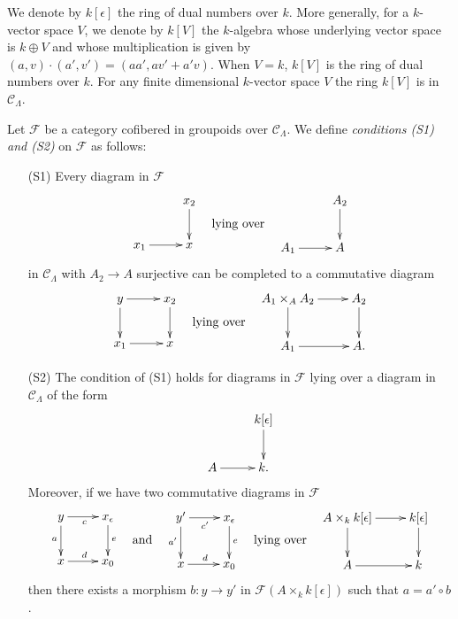 \medskip\noindent
We denote by $k[\epsilon]$ the ring of dual numbers over $k$.  More 
generally, for a $k$-vector space $V$, we denote by $k[V]$ the $k$-algebra 
whose underlying vector space is $k \oplus V$ and whose multiplication is given 
by $(a,v) \cdot (a',v') = (aa', av' + a'v)$.  When $V = k$, $k[V]$ is the ring 
of dual numbers over $k$.  For any finite dimensional $k$-vector space $V$
the ring $k[V]$ is in $\mathcal{C}_\Lambda$.

\begin{definition}
\label{definition-S1-S2}
Let $\mathcal{F}$ be a category cofibered in groupoids over $\mathcal 
C_\Lambda$. We define {\it conditions (S1) and (S2)}
on $\mathcal{F}$ as follows:
\begin{enumerate}
\item[(S1)] Every diagram in $\mathcal{F}$
$$
\vcenter{
\xymatrix{
           & x_2 \ar[d] \\
x_1 \ar[r] & x   
}
}
\quad\text{lying over}\quad
\vcenter{
\xymatrix{
           & A_2 \ar[d] \\
A_1 \ar[r] & A   
}
}
$$  
in $\mathcal{C}_\Lambda$ with $A_2 \to A$ surjective can be completed 
to a commutative diagram
$$
\vcenter{
\xymatrix{
y \ar[r] \ar[d] & x_2 \ar[d] \\
x_1 \ar[r]      & x   
}
}
\quad\text{lying over}\quad
\vcenter{
\xymatrix{
A_1 \times_{A} A_2 \ar[r] \ar[d] & A_2 \ar[d] \\ 
A_1 \ar[r]      & A.   
}
}
$$
\item[(S2)]
The condition of (S1) holds for diagrams in $\mathcal{F}$ lying over 
a diagram in $\mathcal{C}_\Lambda$ of the form
$$
\xymatrix{
          & k[\epsilon] \ar[d] \\
A  \ar[r] & k.
}
$$  
Moreover, if we have two commutative diagrams in $\mathcal{F}$
$$
\vcenter{
\xymatrix{
y \ar[r]_c \ar[d]_a & x_\epsilon \ar[d]^e \\
x \ar[r]^d          & x_0
}
}
\quad\text{and}\quad
\vcenter{
\xymatrix{
y' \ar[r]_{c'} \ar[d]_{a'} & x_\epsilon \ar[d]^e \\
x \ar[r]^d                 & x_0
}
}
\quad\text{lying over}\quad
\vcenter{
\xymatrix{
A \times_{k} k[\epsilon] \ar[r] \ar[d] & k[\epsilon] \ar[d] \\
A  \ar[r] & k 
}
}
$$
then there exists a morphism $b : y \to y'$ in
$\mathcal{F}(A \times_{k} k[\epsilon])$ such that $a = a' \circ b$.
\end{enumerate}
\end{definition}

